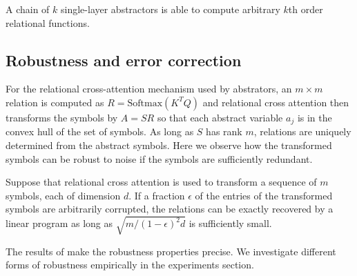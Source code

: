 \begin{result}
A chain of \(k\) single-layer  abstractors is able to compute arbitrary \(k\)th order relational functions.
\end{result}

\subsection{Robustness and error correction}

For the relational cross-attention mechanism used by abstrators, an \(m\times m\) relation
is computed as  \(R = \mbox{Softmax}(K^T Q)\)
and relational cross attention then transforms the symbols by
\(A = SR\) so that each abstract variable \(a_j\) is in the convex hull of the set of symbols.
As long as \(S\) has rank \(m\), relations are uniquely determined from the abstract symbols.
Here we observe how the transformed symbols can be robust to noise if the symbols are
sufficiently redundant. 

\begin{result}
Suppose that relational cross attention is used to transform a sequence of $m$ symbols, each of dimension $d$.
If a fraction $\epsilon$ of the entries of the transformed symbols are arbitrarily corrupted, 
the relations can be exactly recovered by a linear program as long as $\sqrt{m/(1-\epsilon)^2d}$ is sufficiently small.
\end{result}
The results of \cite{model_repair} make the robustness properties precise. We investigate different forms of robustness  empirically in the experiments section.




